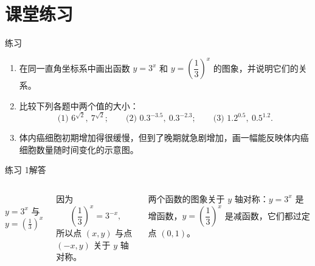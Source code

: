 \documentclass[aspectratio=169,11pt,t,fleqn]{ctexbeamer}
\begin{document}
\section{课堂练习}
\begin{frame}{练习}
  \begin{enumerate}
    \item 在同一直角坐标系中画出函数 $y=3^x$ 和 $y=\left(\dfrac13\right)^x$ 的图象，并说明它们的关系。
    \item 比较下列各题中两个值的大小：
      \[
        \text{(1) }6^{\sqrt2},\ 7^{\sqrt2};\qquad
        \text{(2) }0.3^{-3.5},\ 0.3^{-2.3};\qquad
        \text{(3) }1.2^{0.5},\ 0.5^{1.2}.
      \]
    \item 体内癌细胞初期增加得很缓慢，但到了晚期就急剧增加，画一幅能反映体内癌细胞数量随时间变化的示意图。
  \end{enumerate}
\end{frame}

\begin{frame}{练习 1\quad 解答}
  \begin{columns}
    \centering
    \\[2pt]
    $y=3^x$ 与 $y=\left(\frac13\right)^x$

    \small
    因为
    \[
      \left(\frac13\right)^x=3^{-x},
    \]
    所以点 $(x,y)$ 与点 $(-x,y)$ 关于 $y$ 轴对称。

  \vspace{0.3em}
    两个函数的图象\alert{关于 $y$ 轴对称}：$y=3^x$ 是增函数，$y=\left(\dfrac13\right)^x$ 是减函数，它们都过定点 $(0,1)$。
  \end{columns}
\end{frame}
\end{document}
